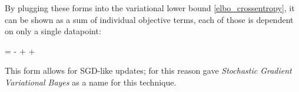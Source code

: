 By plugging these forms into the variational lower bound \ref{elbo_crossentropy},
it can be shown as a sum of individual objective terms, each of those
is dependent on only a single datapoint:
\begin{nalign}
\elboX = \sumiN -\entropy{\qphizi,\pzi} + \entropy{\qphizi } + \expectqphizi{\log \pxicondi}
\end{nalign}

This form allows for SGD-like updates; for this reason \cite{1312.6114}
gave \emph{Stochastic Gradient Variational Bayes} as a name for this technique.
